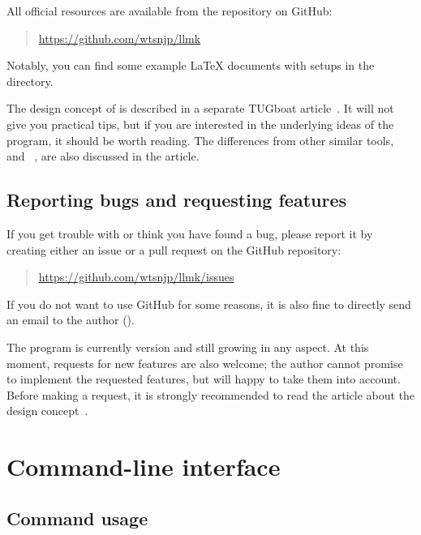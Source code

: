 \documentclass[draft]{llmk-doc}
\begin{document}
\begin{samepage}
All official resources are available from the repository on GitHub:
%
\begin{quote}
\url{https://github.com/wtsnjp/llmk}
\end{quote}
%
Notably, you can find some example {\LaTeX} documents with  setups
in the \href{https://github.com/wtsnjp/llmk/tree/master/examples}
{} directory.
\end{samepage}

The design concept of  is described in a separate TUGboat
article~\cite{asakura2020}. It will not give you practical tips, but if you are
interested in the underlying ideas of the program, it should be worth reading.
The differences from other similar tools, \eg{}~\cite{latexmk} and
~\cite{arara}, are also discussed in the article.

\subsection{Reporting bugs and requesting features}

If you get trouble with  or think you have found a bug, please
report it by creating either an issue or a pull request on the GitHub
repository:
%
\begin{quote}
\url{https://github.com/wtsnjp/llmk/issues}
\end{quote}
%
If you do not want to use GitHub for some reasons, it is also fine to directly
send an email to the author ().

The  program is currently version  and still growing in
any aspect. At this moment, requests for new features are also welcome; the
author cannot promise to implement the requested features, but will happy to
take them into account. Before making a request, it is strongly recommended to
read the article about the design concept~\cite{asakura2020}.

\section{Command-line interface}

\subsection{Command usage}
\label{sec:command}
\end{document}
